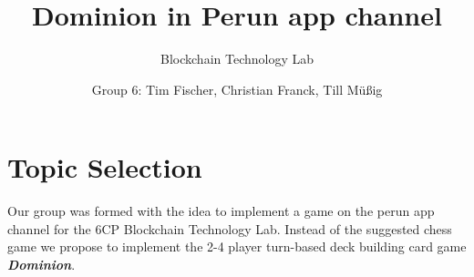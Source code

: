 \documentclass[
	paper=a0,
	ngerman,
	accentcolor=1d,
	logo=body,%
	footer=true,
	]{tudaposter}
\begin{document}
\title{Dominion in Perun app channel}
\subtitle{Blockchain Technology Lab}
\author{Group 6: Tim Fischer, Christian Franck, Till Müßig}




\maketitle

\section*{Topic Selection}
Our group was formed with the idea to implement a game on the perun app channel for the 6CP Blockchain Technology Lab. Instead of the suggested chess game we propose to implement the 2-4 player turn-based deck building card game \textbf{\textit{Dominion}}.\\
\end{document}
